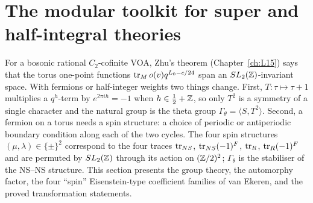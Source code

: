 \section{The modular toolkit for super and half-integral theories}\label{l17:sec:modularity}

For a bosonic rational $C_2$-cofinite VOA, Zhu's theorem (Chapter~\ref{ch:L15}) says that the torus
one-point functions $\operatorname{tr}_Mo(v)q^{L_0-c/24}$ span an $SL_2({\mathbb{Z}})$-invariant space. With fermions or
half-integer weights two things change. First, $T:\tau\mapsto\tau+1$ multiplies a $q^{h}$-term by
$e^{2\pi ih}=-1$ when $h\in\frac12+{\mathbb{Z}}$, so only $T^2$ is a symmetry of a single character and the
natural group is the theta group $\Gamma_\theta=\langle S,T^2\rangle$. Second, a fermion on a torus
needs a spin structure: a choice of periodic or antiperiodic boundary condition along each of the two
cycles. The four spin structures $(\mu,\lambda)\in\{\pm\}^2$ correspond to the four traces
$\operatorname{tr}_{NS}$, $\operatorname{tr}_{NS}(-1)^F$, $\operatorname{tr}_R$, $\operatorname{tr}_R(-1)^F$ and are permuted by $SL_2({\mathbb{Z}})$ through its
action on $({\mathbb{Z}}/2)^2$; $\Gamma_\theta$ is the stabiliser of the NS--NS structure. This section presents
the group theory, the automorphy factor, the four ``spin'' Eisenstein-type coefficient families of
van Ekeren, and the proved transformation statements.

